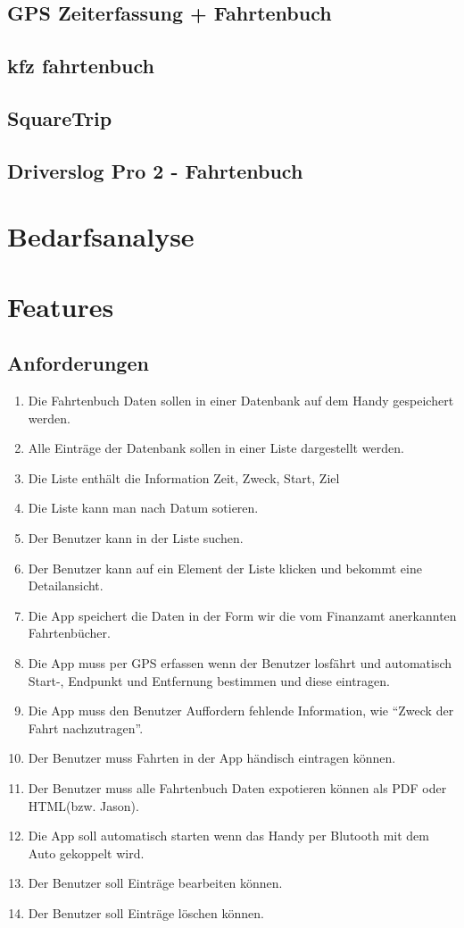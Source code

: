 \documentclass[a4paper]{article}
\begin{document}
\subsection{GPS Zeiterfassung + Fahrtenbuch}


\subsection{kfz fahrtenbuch}


\subsection{SquareTrip}


\subsection{Driverslog Pro 2 - Fahrtenbuch}


\section{Bedarfsanalyse}

\section{Features}
\subsection{Anforderungen}
\begin{enumerate}
	\item Die Fahrtenbuch Daten sollen in einer Datenbank auf dem Handy gespeichert werden.
	\item Alle Einträge der Datenbank sollen in einer Liste dargestellt werden.
	\item Die Liste enthält die Information Zeit, Zweck, Start, Ziel
	\item Die Liste kann man nach Datum sotieren.
	\item Der Benutzer kann in der Liste suchen.
	\item Der Benutzer kann auf ein Element der Liste klicken und bekommt eine Detailansicht.
	\item Die App speichert die Daten in der Form wir die vom Finanzamt anerkannten Fahrtenbücher.
	\item Die App muss per GPS erfassen wenn der Benutzer losfährt und automatisch Start-, Endpunkt und Entfernung bestimmen und diese eintragen.
	\item Die App muss den Benutzer Auffordern fehlende Information, wie \enquote{Zweck der Fahrt nachzutragen}.
	\item Der Benutzer muss Fahrten in der App händisch eintragen können.
	\item Der Benutzer muss alle Fahrtenbuch Daten expotieren können als PDF oder HTML(bzw. Jason).
	\item Die App soll automatisch starten wenn das Handy per Blutooth mit dem Auto gekoppelt wird.
	\item Der Benutzer soll Einträge bearbeiten können.
	\item Der Benutzer soll Einträge löschen können.
\end{enumerate}
\end{document}

